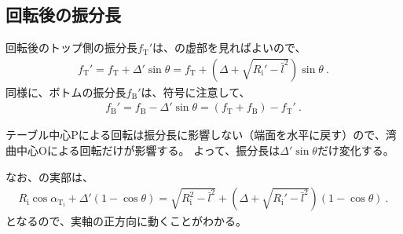 \subsection{回転後の振分長}
回転後のトップ側の振分長$f_\mathrm T'$は、の虚部を見ればよいので、
\begin{align*}
  f_\mathrm T' = f_\mathrm T+\varDelta'\sin\theta = f_\mathrm T+\left(\varDelta+\sqrt{R_\mathrm i'-\bar l^2}\right)\sin\theta\ .
\end{align*}
同様に、ボトムの振分長$f_\mathrm B'$は、符号に注意して、
\begin{align*}
  f_\mathrm B' = f_\mathrm B-\varDelta'\sin\theta = (f_\mathrm T+f_\mathrm B)-f_\mathrm T'\ .
\end{align*}
\begin{hosoku}
テーブル中心Pによる回転は振分長に影響しない（端面を水平に戻す）ので、湾曲中心Oによる回転だけが影響する。
よって、振分長は$\varDelta'\sin\theta$だけ変化する。
\end{hosoku}
なお、の実部は、
\begin{align*}
  R_\mathrm i\cos\alpha_{\mathrm T_\mathrm i}+\varDelta'(1-\cos\theta)
  = \sqrt{R_\mathrm i^2-\bar l^2}+\left(\varDelta+\sqrt{R_\mathrm i'-\bar l^2}\right)\!(1-\cos\theta)\ .
\end{align*}
となるので、実軸の正方向に動くことがわかる。



